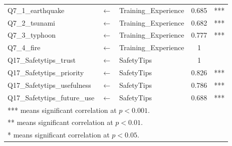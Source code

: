 \begin{table}[h]
\begin{tabular}{lcl|c|c}
Q7\_1\_earthquake       &$\longleftarrow$ & Training\_Experience & 0.685  & ***                  \\
Q7\_2\_tsunami          &$\longleftarrow$ & Training\_Experience & 0.682  & ***                  \\
Q7\_3\_typhoon          &$\longleftarrow$ & Training\_Experience & 0.777  & ***                  \\
Q7\_4\_fire             &$\longleftarrow$ & Training\_Experience & 1      & \\
Q17\_Safetytips\_trust &$\longleftarrow$ & SafetyTips           & 1      &  \\
Q17\_Safetytips\_priority &$\longleftarrow$ & SafetyTips           & 0.826  & ***                  \\
Q17\_Safetytips\_usefulness &$\longleftarrow$ & SafetyTips           & 0.786  & ***                  \\
Q17\_Safetytips\_future\_use &$\longleftarrow$ & SafetyTips           & 0.688  & ***                 \\
 \hline
\multicolumn{5}{l}{*** means significant correlation at $p<0.001$.} \\
\multicolumn{5}{l}{** means significant correlation at $p<0.01$.} \\
\multicolumn{5}{l}{* means significant correlation at $p<0.05$.} \\
  \end{tabular}
\end{table}

